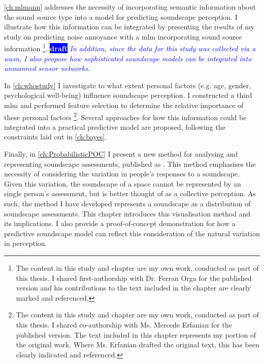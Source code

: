 \documentclass[twoside,fontsize=12pt,titlepage,chapterprefix=true
]{scrbook}
\newcommand{\remark}[3]{%
    {\colorbox{#2}{\sffamily\scriptsize\bfseries\textcolor{white}{#1}}}
    {\sffamily\small\itshape\textcolor{#2}{#3}}
}
\newcommand{\draft}[1]{\remark{draft}{blue}{#1}}
\begin{document}
\cref{ch:mlmann} addresses the necessity of incorporating semantic information about the sound source type into a model for predicting soundscape perception. I illustrate how this information can be integrated by presenting the results of my study on predicting noise annoyance with a \gls{mlm} incorporating sound source information \citep{Orga2021Multilevel}\footnote{The content in this study and chapter are my own work, conducted as part of this thesis. I shared first-authorship with Dr. Ferran Orga for the published version and his contributions to the text included in the chapter are clearly marked and referenced. }. \draft{In addition, since the data for this study was collected via a \gls{wasn}, I also propose how sophisticated soundscape models can be integrated into unmanned sensor networks.}

In \cref{ch:whostudy} I investigate to what extent personal factors (e.g. age, gender, psychological well-being) influence soundscape perception. I constructed a third \gls{mlm} and performed feature selection to determine the relative importance of these personal factors \citep{Erfanian2021Psychological}\footnote{The content in this study and chapter are my own work, conducted as part of this thesis. I shared co-authorship with Ms. Mercede Erfanian for the published version. The text included in this chapter represents my portion of the original work. Where Ms. Erfanian drafted the original text, this has been clearly indicated and referenced.}. Several approaches for how this information could be integrated into a practical predictive model are proposed, following the constraints laid out in \cref{ch:bayes}.

Finally, in \cref{ch:ProbabilisticPOC} I present a new method for analysing and representing soundscape assessments, published as \citet{Mitchell2022How}. This method emphasises the necessity of considering the variation in people's responses to a soundscape. Given this variation, the soundscape of a space cannot be represented by an single person's assessment, but is better thought of as a collective perception. As such, the method I have developed represents a soundscape as a distribution of soundscape assessments. This chapter introduces this visualisation method and its implications. I also provide a proof-of-concept demonstration for how a predictive soundscape model can reflect this consideration of the natural variation in perception.  





\end{document}
